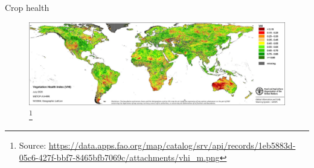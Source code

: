 \documentclass[aspectratio=169]{beamer} %
\begin{document}
    \begin{frame}{Crop health}
      \begin{figure}
        \includegraphics[width = 1\linewidth]{vegetation-health-index.jpg}\footnote{Source: \url{https://data.apps.fao.org/map/catalog/srv/api/records/1eb5883d-05c6-427f-bbf7-8465bfb7069c/attachments/vhi_m.png}}
      \end{figure}
    \end{frame}

  
          
          
          

          
\end{document}
